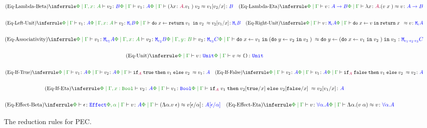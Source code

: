 \begin{figure}[H]
    
    \begin{framed}
        \[
            \scalebox{0.8}{$
            \ntreeruleII{\eqbeta}{\etyperelation{\P}{\gax}{v_2}{B}}{\gpetyperelation{v_1}{A}}{\gpeberelation{\apply{(\lam{x}{A}{v_1})}{v_2} }{ v_1\ssub{x}{v_2}}{B}}
            \quad
            \ntreeruleI{\eqeta}{\gpetyperelation{v}{\ab}}{\gpeberelation{\lam{x}{A}{(\apply{v}{x}})}{v}{\ab}}
            $}
        \]
    
        \[\scalebox{0.8}{$
            \ntreeruleII{\eqleftunit}{\gpetyperelation{v_1}{A} }{ \etyperelation{\P}{\gax}{v_2}{\meb}}{\gpeberelation{\doin{x}{\return{v_1}}{v_2}}{v_2\ssub{x}{v_1}}{\meb}}
            \quad
            \ntreeruleI{\eqrightunit}{\gpetyperelation{v}{\mea}}{\gpeberelation{\doin{x}{v}{\return{x}} }{v}{\mea}}
        $}\]
    
        \[\scalebox{0.8}{$
            \ntreeruleIII{\eqassociativity}{\gpetyperelation{v_1}{\M{\e_1}{A}} }{\etyperelation{\P}{\gax}{v_2}{\M{\e_2}{B}}}{ \etyperelation{\P}{\gby}{v_3}{\M{\e_3}{C}}}{
                \gpeberelation{\doin{x}{v_1}{(\doin{y}{v_2}{v_3})}}{\doin{y}{(\doin{x}{v_1}{v_2})}{v_3}}{\M{\e_1 \dot \e_2 \dot \e_3}{C}}
            }
        $}\]
    
        \[\scalebox{0.8}{$
            \ntreeruleI{\equnitequiv}{\gpetyperelation{v}{\U}}{\gpeberelation{v}{\u}{\U}}
        $}\]
    
        \[\scalebox{0.8}{$
            \ntreeruleII{\eqiftrue}{\gpetyperelation{v_1}{A}}{\gpetyperelation{v_2}{A}}{\gpeberelation{\pifthenelse{A}{\t}{v_1}{v_2}}{v_1}{A}}
            \quad
            \ntreeruleII{\eqiffalse}{\gpetyperelation{v_2}{A}}{\gpetyperelation{v_1}{A}}{\gpeberelation{\pifthenelse{A}{\f}{v_1}{v_2}}{v_2}{A}}    
        $}\]
    
        \[\scalebox{0.8}{$
            \ntreeruleII{\eqifeta}{\etyperelation{\P}{\G, x: \B}{v_2}{A}}{\gpetyperelation{v_1}{\B}}{\gpeberelation{\pifthenelse{A}{v_1}{v_2\ssub{x}{\t}}{v_2\ssub{x}{\f}}}{v_2\ssub{x}{v_1}}{A}}
        $}\]
    
        \[\scalebox{0.8}{$
            \ntreeruleII{\eqeffbeta}{\wellformedeffect{\P}{\e}}{\etyperelation{\P, \a}{\G}{v}{A}}{\gpeberelation{\eapp{(\elam{\a}{v}}{\e})}{v\ssub{\a}{\e}}{A\ssub{\a}{\e}}}
            \quad 
            \ntreeruleI{\eqeffeta}{\etyperelation{\P}{\G}{v}{\all{\a}{A}}}{\gpeberelation{\elam{\a}{(\eapp{v}{\a})}}{v}{\all{\a}{A}}}
        $}\]
    \end{framed}
    \caption{The reduction rules for PEC.}
    \label{BetaEtaReductions}
\end{figure}

